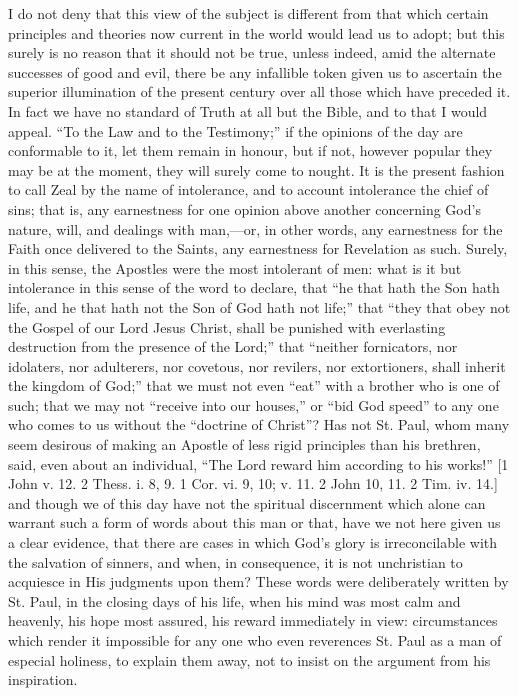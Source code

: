I do not deny that this view of the subject is different from that
which certain principles and theories now current in the world would
lead us to adopt; but this surely is no reason that it should not be
true, unless indeed, amid the alternate successes of good and evil,
there be any infallible token given us to ascertain the superior
illumination of the present century over all those which have preceded
it. In fact we have no standard of Truth at all but the Bible, and to
that I would appeal. ``To the Law and to the Testimony;'' if the
opinions of the day are conformable to it, let them remain in honour,
but if not, however popular they may be at the moment, they will surely
come to nought. It is the present fashion to call Zeal by the name of
intolerance, and to account intolerance the chief of sins; that is, any
earnestness for one opinion above another concerning God's nature, will,
and dealings with man,—or, in other words, any earnestness for the
Faith once delivered to the Saints, any earnestness for Revelation as
such. Surely, in this sense, the Apostles were the most intolerant of
men: what is it but intolerance in this sense of the word to declare,
that ``he that hath the Son hath life, and he that hath not the Son
of God hath not life;'' that ``they that obey not the Gospel of
our Lord Jesus Christ, shall be punished with everlasting destruction
from the presence of the Lord;'' that ``neither fornicators, nor
idolaters, nor adulterers, nor covetous, nor revilers, nor extortioners,
shall inherit the kingdom of God;'' that we must not even
``eat'' with a brother who is one of such; that we may not
``receive into our houses,'' or ``bid God speed'' to any
one who comes to us without the ``doctrine of Christ''? Has not
St. Paul, whom many seem desirous of making an Apostle of less rigid
principles than his brethren, said, even about an individual, ``The
Lord reward him according to his works!'' [1 John v. 12. 2 Thess. i.
8, 9. 1 Cor. vi. 9, 10; v. 11. 2 John 10, 11. 2 Tim. iv. 14.] and though
we of this day have not the spiritual discernment which alone can
warrant such a form of words about this man or that, have we not here
given us a clear evidence, that there are cases in which God's glory is
irreconcilable with the salvation of sinners, and when, in consequence,
it is not unchristian to acquiesce in His judgments upon them? These
words were deliberately written by St. Paul, in the closing days of his
life, when his mind was most calm and heavenly, his hope most assured,
his reward immediately in view: circumstances which render it impossible
for any one who even reverences St. Paul as a man of especial holiness,
to explain them away, not to insist on the argument from his
inspiration.

